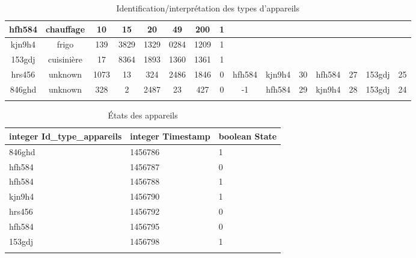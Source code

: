 \documentclass[10pt,a4paper]{article}
\begin{document}
\begin{table}[h]
{\begin{tabular}{|c|c|c|c|c|c|c|c|c|c|c|c|c|c|c|}
hfh584 & chauffage & 10 & 15 & 20 & 49 & 200 & 1 &  &  &  &  &  &  &  \\ \hline
kjn9h4 & frigo & 139 & 3829 & 1329 & 0284 & 1209 & 1 &  &  &  &  &  &  &  \\ \hline
153gdj & cuisinière & 17 & 8364 & 1893 & 1360 & 1361 & 1 &  &  &  &  &  &  &  \\ \hline
hrs456 & unknown & 1073 & 13 & 324 & 2486 & 1846 & 0 & hfh584 & kjn9h4 & 30 & hfh584 & 27 & 153gdj & 25 \\ \hline
846ghd & unknown & 328 & 2 & 2487 & 23 & 427 & 0 & -1 & hfh584 & 29 & kjn9h4 & 28 & 153gdj & 24 \\ \hline
 &  &  &  &  &  &  &  &  &  &  &  &  &  & 
\end{tabular}
}
\caption{Identification/interprétation des types d'appareils}
\end{table}

\begin{table}[h!]
\centering
    \begin{tabular}{|l|l|l|}
    \hline
    \rowcolor[HTML]{EFEFEF} 
    integer Id\_type\_appareils & integer Timestamp & boolean State \\ \hline
    846ghd       & 1456786           & 1             \\ \hline
    hfh584       & 1456787           & 0             \\ \hline
    hfh584       & 1456788           & 1             \\ \hline
    kjn9h4       & 1456790           & 1             \\ \hline
    hrs456       & 1456792           & 0             \\ \hline
    hfh584       & 1456795           & 0             \\ \hline
    153gdj       & 1456798           & 1             \\ \hline
                 &                   &              
    \end{tabular}
    \caption{États des appareils}
\end{table}
\newpage
\end{document}
